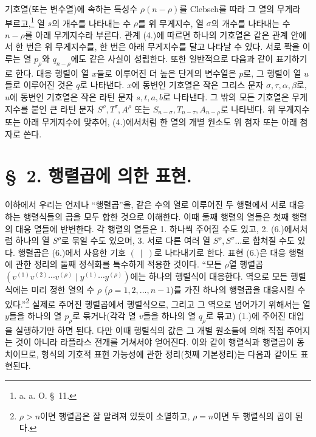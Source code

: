 기호열(또는 변수열)에 속하는 특성수 $\rho(n-\rho)$를 Clebsch를 따라 그 열의 무게라 부르고,\footnote{a. a. O. \S\ 11.} 열 $s$의 개수를 나타내는 수 $\rho$를 위 무게지수, 열 $\sigma$의 개수를 나타내는 수 $n-\rho$를 아래 무게지수라 부른다. 관계 (4.)에 따르면 하나의 기호열은 같은 관계 안에서 한 번은 위 무게지수를, 한 번은 아래 무게지수를 달고 나타날 수 있다. 서로 짝을 이루는 열 $p_\rho$와 $q_{n-\rho}$에도 같은 사실이 성립한다. 또한 일반적으로 다음과 같이 표기하기로 한다. 대응 행렬이 열 $x$들로 이루어진 더 높은 단계의 변수열은 $p$로, 그 행렬이 열 $u$들로 이루어진 것은 $q$로 나타낸다. $x$에 동변인 기호열은 작은 그리스 문자 $\sigma,\tau,\alpha,\beta$로, $u$에 동변인 기호열은 작은 라틴 문자 $s,t,a,b$로 나타낸다. 그 밖의 모든 기호열은 무게지수를 붙인 큰 라틴 문자 $S^\rho,T^\tau,A^\rho$ 또는 $S_{n-\sigma},T_{n-\tau},A_{n-\rho}$로 나타낸다. 위 무게지수 또는 아래 무게지수에 맞추어, (4.)에서처럼 한 열의 개별 원소도 위 첨자 또는 아래 첨자로 쓴다.

\section*{\S\ 2. 행렬곱에 의한 표현.}
이하에서 우리는 언제나 ``행렬곱''을, 같은 수의 열로 이루어진 두 행렬에서 서로 대응하는 행렬식들의 곱을 모두 합한 것으로 이해한다. 이때 둘째 행렬의 열들은 첫째 행렬의 대응 열들에 반변한다. 각 행렬의 열들은 1. 하나씩 주어질 수도 있고, 2. (6.)에서처럼 하나의 열 $S^\rho$로 묶일 수도 있으며, 3. 서로 다른 여러 열 $S^\rho,S^\sigma\ldots$로 합쳐질 수도 있다. 행렬곱은 (6.)에서 사용한 기호 $(\ \mid\ )$로 나타내기로 한다. 표현 (6.)은 대응 행렬에 관한 정리의 둘째 정식화를 특수하게 적용한 것이다. ``모든 $\rho$열 행렬곱 $(v^{(1)}v^{(2)}\cdots v^{(\rho)}\mid y^{(1)}\cdots y^{(\rho)})$에는 하나의 행렬식이 대응한다. 역으로 모든 행렬식에는 미리 정한 열의 수 $\rho$ ($\rho=1,2,\ldots,n-1$)를 가진 하나의 행렬곱을 대응시킬 수 있다.''\footnote{$\rho>n$이면 행렬곱은 잘 알려져 있듯이 소멸하고, $\rho=n$이면 두 행렬식의 곱이 된다.} 실제로 주어진 행렬곱에서 행렬식으로, 그리고 그 역으로 넘어가기 위해서는 열 $y$들을 하나의 열 $p_\rho$로 묶거나(각각 열 $v$들을 하나의 열 $q_\rho$로 묶고) (1.)에 주어진 대입을 실행하기만 하면 된다. 다만 이때 행렬식의 값은 그 개별 원소들에 의해 직접 주어지는 것이 아니라 라플라스 전개를 거쳐서야 얻어진다. 이와 같이 행렬식과 행렬곱이 동치이므로, 형식의 기호적 표현 가능성에 관한 정리(첫째 기본정리)는 다음과 같이도 표현된다.

